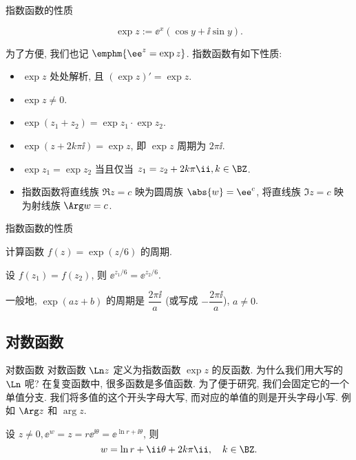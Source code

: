 \begin{frame}{指数函数的性质}
	\onslide<+->
	\begin{definition*}[][指数函数]
	\[
		\exp z:=\ee^x(\cos y+\ii\sin y).
	\]
	\end{definition*}
	\onslide<+->
	为了方便, 我们也记 $\emphm{\ee^z=\exp z}$.
	\onslide<+->
	指数函数有如下性质:
	\begin{itemize}\bf
		\item $\exp z$ 处处解析, 且 $(\exp z)'=\exp z$.
		\item $\exp z\neq 0$.
		\item $\exp(z_1+z_2)=\exp z_1\cdot \exp z_2$.
		\item $\exp(z+2k\pi\ii)=\exp z$, 即 $\exp z$ 周期为 $2\pi\ii$.
		\item $\exp z_1=\exp z_2$ 当且仅当 $z_1=z_2+2k\pi\ii,k\in\BZ$.
		\item 指数函数将直线族 $\Re z=c$ 映为圆周族 $\abs{w}=\ee^c$, 将直线族 $\Im z=c$ 映为射线族 $\Arg w=c$.
	\end{itemize}
\end{frame}


\begin{frame}{指数函数的性质}
	\onslide<+->
	\begin{example}
		计算函数 $f(z)=\exp(z/6)$ 的周期.
	\end{example}

	\onslide<+->
	\begin{solution}
		设 $f(z_1)=f(z_2)$, 则 $\ee^{z_1/6}=\ee^{z_2/6}$.
		\onslide<+->{%
			所以 $f(z)$ 的周期是 $12\pi\ii$.
		}
	\end{solution}

	\onslide<+->
	一般地, $\exp(az+b)$ 的周期是 $\dfrac{2\pi\ii}a$ (或写成 $-\dfrac{2\pi\ii}a$), $a\neq 0$.
\end{frame}


\subsection{对数函数}

\begin{frame}{对数函数}
	\onslide<+->
	对数函数 $\Ln z$ 定义为指数函数 $\exp z$ 的反函数.
	\onslide<+->
	为什么我们用大写的 $\Ln$ 呢? 
	\onslide<+->
	在复变函数中, 很多函数是多值函数.
	\onslide<+->
	为了便于研究, 我们会固定它的一个单值分支.
	\onslide<+->
	我们将多值的这个开头字母大写, 而对应的单值的则是开头字母小写.
	\onslide<+->
	例如 $\Arg z$ 和 $\arg z$.

	\onslide<+->
	设 $z\neq0,\ee^w=z=r\ee^{\ii\theta}=\ee^{\ln r+\ii\theta}$,
	\onslide<+->
	则
	\[w=\ln r+\ii\theta+2k\pi\ii,\quad k\in\BZ.
	\]
\end{frame}


